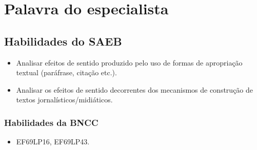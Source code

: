

\chapter{Palavra do especialista}

\section*{Habilidades do SAEB}
\begin{itemize}
\item Analisar efeitos de sentido produzido pelo uso de
formas de apropriação textual (paráfrase, citação etc.).
\item Analisar os
efeitos de sentido decorrentes dos mecanismos de construção de textos
jornalísticos/midiáticos.
\end{itemize}

\subsection*{Habilidades da BNCC}
\begin{itemize}
\item EF69LP16, EF69LP43.
\end{itemize}

